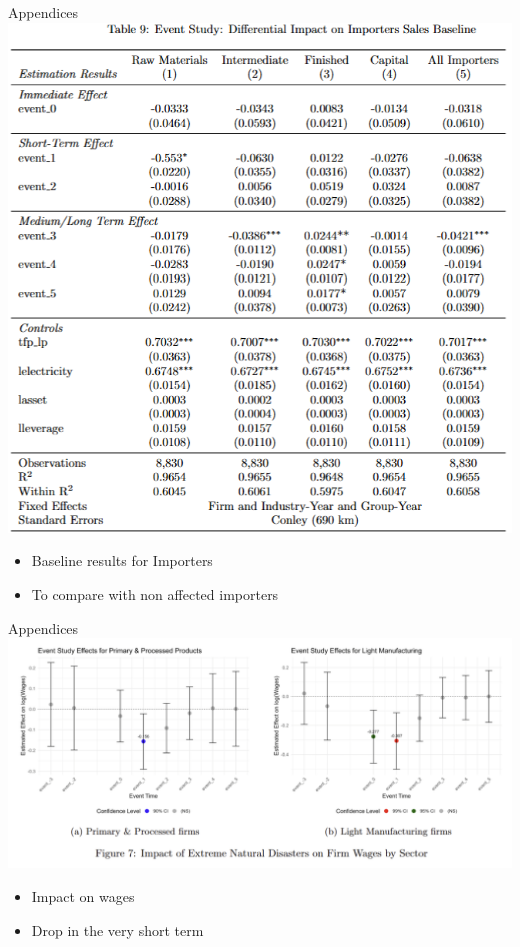 \documentclass[
  xcolor=svgnames,
  bookmarks=true,
  bookmarksopen=true,
  pdfborder={0 0 0},
  pdfhighlight={/N},
  linkbordercolor={rgb}{0.5,0.5,0.5},
  implicit=false,
  colorlinks=true,
  allcolors=deepblue
]{beamer}
\begin{document}
\begin{frame}{Appendices}
    \centering
    \includegraphics[height = 7 cm]{Baselines Importers.png}
    \begin{itemize}
        \item Baseline results for Importers
        \item To compare with non affected importers
    \end{itemize}
\end{frame}

\begin{frame}{Appendices}
    \centering
    \includegraphics[height = 5.5 cm]{Results on Wages.png}
    \begin{itemize}
        \item Impact on wages
        \item Drop in the very short term
    \end{itemize}
\end{frame}
\end{document}
